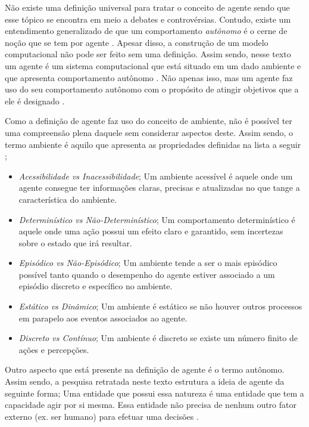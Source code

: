 Não existe uma definição universal para tratar o conceito de agente sendo que esse tópico se encontra em meio a debates e controvérsias. Contudo, existe um entendimento generalizado de que um comportamento \textit{autônomo} é o cerne de noção que se tem por agente \cite{whatisagent}. Apesar disso, a construção de um modelo computacional não pode ser feito sem uma definição. Assim sendo, nesse texto um agente é um sistema computacional que está situado em um dado ambiente e que apresenta comportamento autônomo \cite{whatisagent} \cite{whatisagent}. Não apenas isso, mas um agente faz uso do seu comportamento autônomo com o propósito de atingir objetivos que a ele é designado \cite{whatisagent}.

Como a definição de agente faz uso do conceito de ambiente, não é possível ter uma compreensão plena daquele sem considerar aspectos deste. Assim sendo, o termo ambiente  é aquilo que apresenta as propriedades definidas na lista a seguir \cite{artificialinteligencemodermapproach} \cite{whatisagent}; 
\begin{itemize}
    \item \textit{Acessibilidade vs Inacessibilidade}; Um ambiente acessível é aquele onde um agente consegue ter informações claras, precisas e atualizadas no que tange a característica do ambiente.
    \item \textit{Determinístico vs Não-Determinístico}; Um comportamento determinístico é aquele onde uma ação possui um efeito claro e garantido, sem incertezas sobre o estado que irá resultar.
    \item \textit{Episódico vs Não-Episódico}; Um ambiente tende a ser o mais episódico possível tanto quando o desempenho do agente estiver associado a um episódio discreto e específico no ambiente.
    \item \textit{Estático vs Dinâmico}; Um ambiente é estático se não houver outros processos em parapelo aos eventos associados ao agente.
    \item \textit{Discreto vs Contínuo}; Um ambiente é discreto se existe um número finito de ações e percepções. 
\end{itemize}

Outro aspecto que está presente na definição de agente é o termo autônomo. Assim sendo, a pesquisa retratada neste texto estrutura a ideia de agente da seguinte forma; Uma entidade que possui essa natureza é uma entidade que tem a capacidade agir por si mesma. Essa entidade não precisa de nenhum outro fator externo (ex. ser humano) para efetuar uma decisões \cite{whatisagent}.

